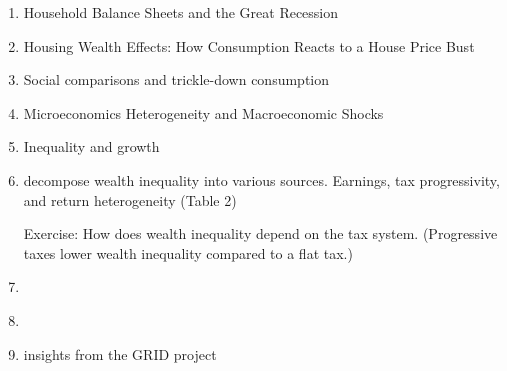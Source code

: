 \documentclass[a4paper,12pt]{article}
\begin{document}
\begin{enumerate}
 \item Household Balance Sheets and the Great Recession
 \item Housing Wealth Effects: How Consumption Reacts to a House Price Bust
   \item Social comparisons and trickle-down consumption
     \citep{bertrand2016trickle, bellet2019mcmansion, drechsel2021falling-behind}
   \item Microeconomics Heterogeneity and Macroeconomic Shocks \citep{kaplan2018microeconomic}
   \item Inequality and growth \citep{moll2022uneven}
   \item \citet{hubmer2021sources} decompose wealth inequality into various sources. Earnings, tax progressivity, and return heterogeneity (Table 2)

   Exercise: How does wealth inequality depend on the tax system. (Progressive taxes lower wealth inequality compared to a flat tax.)

   \item \citet{guvenen2023use}
   \item \citet{fagereng2022asset}
   \item \citet{guvenen2022global} insights from the GRID project
\end{enumerate}







\end{document}

